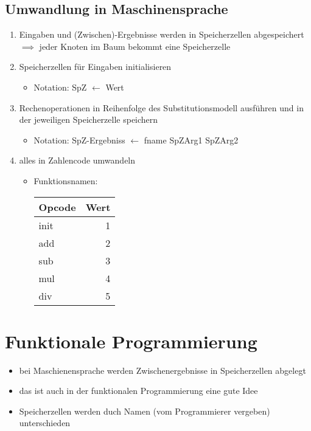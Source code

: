 \documentclass[a4paper]{scrartcl}
\theoremstyle{definition}
\theoremstyle{plain}
\theoremstyle{remark}
\theoremstyle{remark}
\begin{document}
\subsection{Umwandlung in Maschinensprache}
\label{sec-5-1}
\begin{enumerate}
\item Eingaben und (Zwischen)-Ergebnisse werden in Speicherzellen abgespeichert $\implies$ jeder Knoten im Baum bekommt eine Speicherzelle
\item Speicherzellen für Eingaben initialisieren
\begin{itemize}
\item Notation: SpZ $\leftarrow$ Wert
\end{itemize}
\item Rechenoperationen in Reihenfolge des Substitutionsmodell ausführen und in der jeweiligen Speicherzelle speichern
\begin{itemize}
\item Notation: SpZ-Ergebniss $\leftarrow$ fname SpZArg1 SpZArg2
\end{itemize}
\item alles in Zahlencode umwandeln
\begin{itemize}
\item Funktionsnamen:
\begin{center}
\begin{tabular}{lr}
Opcode & Wert\\
\hline
init & 1\\
add & 2\\
sub & 3\\
mul & 4\\
div & 5\\
\end{tabular}
\end{center}
\end{itemize}
\end{enumerate}
\section{Funktionale Programmierung}
\label{sec-6}
\begin{itemize}
\item bei Maschienensprache werden Zwischenergebnisse in Speicherzellen abgelegt
\item das ist auch in der funktionalen Programmierung eine gute Idee
\item Speicherzellen werden duch Namen (vom Programmierer vergeben) unterschieden
\end{itemize}
\end{document}
